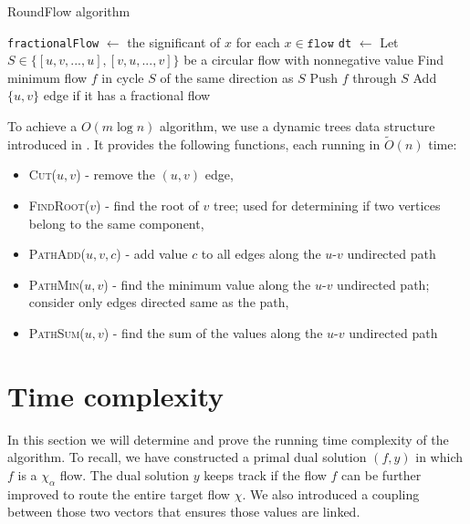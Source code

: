 \begin{algorithm}
\caption{RoundFlow algorithm}
\begin{algorithmic}[1]
\State \texttt{fractionalFlow} $\gets$ the significant of $x$ for each $x \in \texttt{flow}$
\State \texttt{dt} $\gets$ 
          
        \State Let $S\in\{[u,v,...,u],[v,u,...,v]\}$ be a circular flow
        \State with nonnegative value 
        \State Find minimum flow $f$ in cycle $S$ of the same
        \State direction as $S$
        \State Push $f$ through $S$
    \EndIf
    \State Add $\{u,v\}$ edge if it has a fractional flow 
\EndFor
\EndFunction
\end{algorithmic}
\end{algorithm}

To achieve a $O(m\log n)$ algorithm, we use a dynamic trees data structure introduced in \cite{dynamic_trees}. It provides the following functions, each running in $\tilde{O}(n)$ time:
\begin{itemize}
    \item \textsc{Cut($u, v$)} - remove the $(u,v)$ edge,
    \item \textsc{FindRoot($v$)} - find the root of $v$ tree; used for determining if two vertices belong to the same component,
    \item \textsc{PathAdd($u, v, c$)} - add value $c$ to all edges along the $u$-$v$ undirected path
    \item \textsc{PathMin($u, v$)} - find the minimum value along the $u$-$v$ undirected path; consider only edges directed same as the path, 
    \item \textsc{PathSum($u, v$)} - find the sum of the values along the $u$-$v$ undirected path
\end{itemize}

\section{Time complexity}
In this section we will determine and prove the running time complexity of the algorithm. To recall, we have constructed a primal dual solution $(f,y)$ in which $f$ is a $\chi_\alpha$ flow. 
The dual solution $y$ keeps track if the flow $f$ can be further improved to route the entire target flow $\chi$. We also introduced a coupling between those two vectors that ensures those values are linked.

